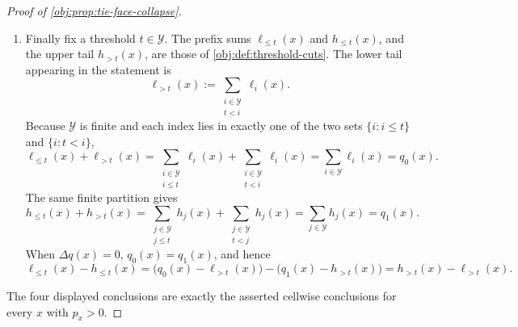 \begin{proof}[Proof of \cref{obj:prop:tie-face-collapse}]
\begin{enumerate}
\item Finally fix a threshold \(t\in\mathcal Y\). The prefix sums \(\ell_{\le t}(x)\) and \(h_{\le t}(x)\), and the upper tail \(h_{>t}(x)\), are those of \cref{obj:def:threshold-cuts}. The lower tail appearing in the statement is
\[
\ell_{>t}(x):=\sum_{\substack{i\in\mathcal Y\\ t<i}}\ell_i(x).
\]
Because \(\mathcal Y\) is finite and each index lies in exactly one of the two sets \(\{i:i\le t\}\) and \(\{i:t<i\}\),
\[
\ell_{\le t}(x)+\ell_{>t}(x)
=
\sum_{\substack{i\in\mathcal Y\\ i\le t}}\ell_i(x)
+
\sum_{\substack{i\in\mathcal Y\\ t<i}}\ell_i(x)
=
\sum_{i\in\mathcal Y}\ell_i(x)
=
q_0(x).
\]
The same finite partition gives
\[
h_{\le t}(x)+h_{>t}(x)
=
\sum_{\substack{j\in\mathcal Y\\ j\le t}}h_j(x)
+
\sum_{\substack{j\in\mathcal Y\\ t<j}}h_j(x)
=
\sum_{j\in\mathcal Y}h_j(x)
=
q_1(x).
\]
When \(\Delta q(x)=0\), \(q_0(x)=q_1(x)\), and hence
\[
\ell_{\le t}(x)-h_{\le t}(x)
=
\bigl(q_0(x)-\ell_{>t}(x)\bigr)
-
\bigl(q_1(x)-h_{>t}(x)\bigr)
=
h_{>t}(x)-\ell_{>t}(x).
\]
\end{enumerate}
The four displayed conclusions are exactly the asserted cellwise conclusions for every \(x\) with \(p_x>0\). %
\end{proof}


